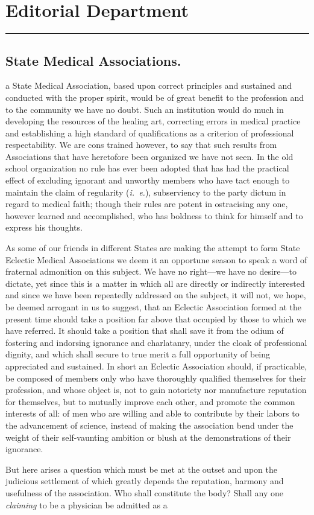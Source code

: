 \chapter*{Editorial Department}

\fancybreak{*}

\section*{State Medical Associations.}

 a State Medical Association, based upon correct principles and
sustained and conducted with the proper spirit, would be of great benefit
to the profession and to the community we have no doubt. Such an
institution would do much in developing the resources of the healing
art, correcting errors in medical practice and establishing a high standard
of qualifications as a criterion of professional respectability. We
are cons trained however, to say that such results from Associations that
have heretofore been organized we have not seen. In the old school
organization no rule has ever been adopted that has had the practical
effect of excluding ignorant and unworthy members who have tact
enough to maintain the claim of regularity (\emph{i.~e.}), subserviency to the
party dictum in regard to medical faith; though their rules are potent
in ostracising any one, however learned and accomplished, who has boldness
to think for himself and to express his thoughts.

As some of our friends in different States are making the attempt to
form State Eclectic Medical Associations we deem it an opportune
season to speak a word of fraternal admonition on this subject. We
have no right---we have no desire---to dictate, yet since this is a matter
in which all are directly or indirectly interested and since we have been
repeatedly addressed on the subject, it will not, we hope, be deemed
arrogant in us to suggest, that an Eclectic Association formed at the
present time should take a position far above that occupied by those
to which we have referred. It should take a position that shall save
it from the odium of fostering and indorsing ignorance and charlatanry,
under the cloak of professional dignity, and which shall secure to true
merit a full opportunity of being appreciated and sustained. In short
an Eclectic Association should, if practicable, be composed of members
only who have thoroughly qualified themselves for their profession, and
whose object is, not to gain notoriety nor manufacture reputation for
themselves, but to mutually improve each other, and promote the common
interests of all: of men who are willing and able to contribute by
their labors to the advancement of science, instead of making the
association bend under the weight of their self-vaunting ambition or
blush at the demonstrations of their ignorance.

But here arises a question which must be met at the outset and
upon the judicious settlement of which greatly depends the reputation,
harmony and usefulness of the association. Who shall constitute the
body?  Shall any one \emph{claiming} to be a physician be admitted as a\endinput

